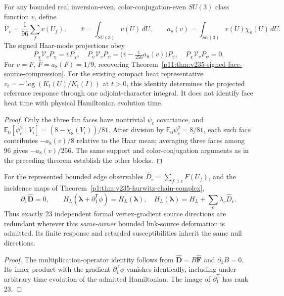 \documentclass[12pt,a4paper]{article}
\begin{document}
\begin{corollary}
\label{p11:cor:v235-signed-adjoint-selection}
For any bounded real inversion-even, color-conjugation-even
\(SU(3)\) class function \(v\), define
\[
 \mathcal V_v=\frac1{96}\sum_fv(U_f),\qquad
 \bar v=\int_{SU(3)}v(U)\,dU,\qquad
 a_8(v)=\int_{SU(3)}v(U)\chi_8(U)\,dU.
\]
The signed Haar-mode projections obey
\[
 \boxed{P_\chi\mathcal V_vP_\chi=\bar v P_\chi,
 \quad P_\psi\mathcal V_vP_\psi
 =\bigl(\bar v-\tfrac1{256}a_8(v)\bigr)P_\psi,
 \quad P_\chi\mathcal V_vP_\psi=0.}
\]
For \(v=F\), \(\bar F=a_8(F)=1/9\), recovering
Theorem~\ref{p11:thm:v235-signed-face-source-compression}.
For the existing compact heat representative
\(v_t=-\log(K_t(U)/K_t(I))\) at \(t>0\), this identity determines
the projected reference response through one adjoint-character
integral.  It does not identify face heat time with physical
Hamiltonian evolution time.
\end{corollary}
\begin{proof}
Only the three fan faces have nontrivial \(\psi_e\) covariance,
and \(\mathbb E_0[\psi_e^2\mid V_i]
=(8-\chi_8(V_i))/81\).
After division by \(\mathbb E_0\psi_e^2=8/81\), each such face
contributes \(-a_8(v)/8\) relative to the Haar mean; averaging
three faces among \(96\) gives \(-a_8(v)/256\).
The same support and color-conjugation arguments as in the
preceding theorem establish the other blocks.
\end{proof}

\begin{corollary}
\label{p11:cor:v235-hurwitz-edge-source-ward}
For the represented bounded edge observables
\(\widehat D_e=\sum_{f\supset e}F(U_f)\), and the incidence
maps of Theorem~\ref{p1:thm:v235-hurwitz-chain-complex},
\[
 \partial_1\widehat{\mathbf D}=0,\qquad
 H_L(\boldsymbol\lambda+\partial_1^{\mathsf T}\phi)
 =H_L(\boldsymbol\lambda),\quad
 H_L(\boldsymbol\lambda)=H_L+\sum_e\lambda_e\widehat D_e.
\]
Thus exactly \(23\) independent formal vertex-gradient source
directions are redundant wherever this \emph{same-owner} bounded
link-source deformation is admitted.  Its finite response and
retarded susceptibilities inherit the same null directions.
\end{corollary}
\begin{proof}
The multiplication-operator identity follows from
\(\widehat{\mathbf D}=B\widehat{\mathbf F}\) and
\(\partial_1B=0\).  Its inner product with the gradient
\(\partial_1^{\mathsf T}\phi\) vanishes identically, including
under arbitrary time evolution of the admitted Hamiltonian.
The image of \(\partial_1^{\mathsf T}\) has rank \(23\).
\end{proof}
\end{document}
